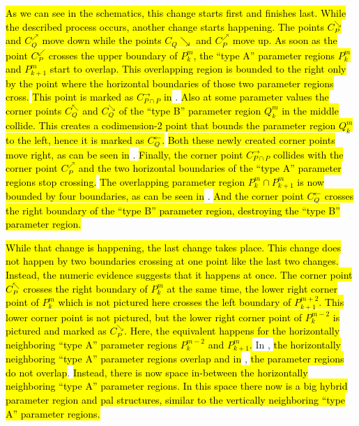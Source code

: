 \hl{
As we can see in the schematics, this change starts first and finishes last.
While the described process occurs, another change starts happening.
The points $C_P^\searrow$ and $C_Q^\nearrow$ move down while the points $C_Q\searrow$ and $C_P^\nearrow$ move up.
As soon as the point $C_P^\swarrow$ crosses the upper boundary of $P^m_k$, the ``type A'' parameter regions $P^m_k$ and $P^m_{k+1}$ start to overlap.
This overlapping region is bounded to the right only by the point where the horizontal boundaries of those two parameter regions cross.
}
\hl{This point is marked as $C_{P \cap P}^\rightarrow$ in} .
\hl{
	Also at some parameter values the corner points $C_Q^\nwarrow$ and $C_Q^\searrow$ of the ``type B'' parameter region $Q^m_k$ in the middle collide.
	This creates a codimension-2 point that bounds the parameter region $Q^m_k$ to the left, hence it is marked as $C_Q^\leftarrow$.
}
\hl{Both these newly created corner points move right, as can be seen in} .
\hl{
	Finally, the corner point $C_{P \cap P}^\rightarrow$ collides with the corner point $C_P^\nearrow$ and the two horizontal boundaries of the ``type A'' parameter regions stop crossing.
}
\hl{The overlapping parameter region $P^m_k \cap P^m_{k+1}$ is now bounded by four boundaries, as can be seen in} .
\hl{
	And the corner point $C_Q^\leftarrow$ crosses the right boundary of the ``type B'' parameter region, destroying the ``type B'' parameter region.
}

\hl{
While that change is happening, the last change takes place.
This change does not happen by two boundaries crossing at one point like the last two changes.
Instead, the numeric evidence suggests that it happens at once.
The corner point $C_P^\nwarrow$ crosses the right boundary of $P^m_k$ at the same time, the lower right corner point of $P^{m}_{k}$ which is not pictured here crosses the left boundary of $P^{m+2}_{k+1}$.
This lower corner point is not pictured, but the lower right corner point of $P^{m-2}_k$ is pictured and marked as $C_P^\searrow$.
Here, the equivalent happens for the horizontally neighboring ``type A'' parameter regions $P^{m-2}_k$ and $P^m_{k+1}$.
}
In , \hl{the horizontally neighboring ``type A'' parameter regions overlap and in} , \hl{the parameter regions do not overlap}.
\hl{
	Instead, there is now space in-between the horizontally neighboring ``type A'' parameter regions.
	In this space there now is a big hybrid parameter region and \gls{pal} structures, similar to the vertically neighboring ``type A'' parameter regions.
}

